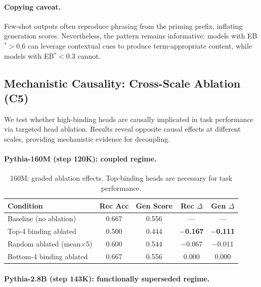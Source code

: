 \documentclass[10pt]{article} %
\begin{document}
\paragraph{Copying caveat.}
Few-shot outputs often reproduce phrasing from the priming prefix, inflating generation scores.
Nevertheless, the pattern remains informative: models with EB$^*>0.6$ can leverage contextual cues to produce term-appropriate content, while models with EB$^*<0.3$ cannot.

\subsection{Mechanistic Causality: Cross-Scale Ablation (C5)}\label{sec:c5}

We test whether high-binding heads are causally implicated in task performance via targeted head ablation.
Results reveal opposite causal effects at different scales, providing mechanistic evidence for decoupling.

\paragraph{Pythia-160M (step 120K): coupled regime.}\mbox{}

\begin{table}[h]
\centering
\begin{tabular}{|l|c|c|c|c|}
\hline
\textbf{Condition} & \textbf{Rec Acc} & \textbf{Gen Score} & \textbf{Rec $\Delta$} & \textbf{Gen $\Delta$} \\
\hline
Baseline (no ablation) & 0.667 & 0.556 & --- & --- \\
Top-4 binding ablated & 0.500 & 0.444 & \textbf{$-$0.167} & \textbf{$-$0.111} \\
Random ablated (mean$\times$5) & 0.600 & 0.544 & $-$0.067 & $-$0.011 \\
Bottom-4 binding ablated & 0.667 & 0.556 & 0.000 & 0.000 \\
\hline
\end{tabular}
\caption{160M: graded ablation effects. Top-binding heads are necessary for task performance.}
\label{tab:c5_160m_ablation}
\end{table}

\paragraph{Pythia-2.8B (step 143K): functionally superseded regime.}\mbox{}
\end{document}
